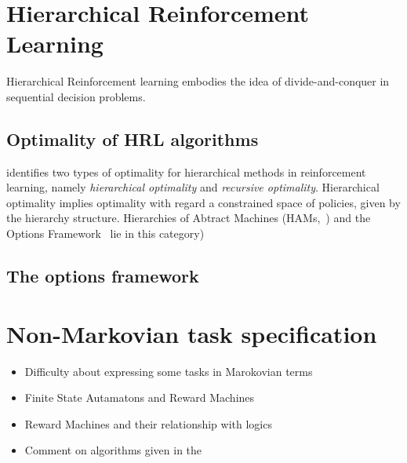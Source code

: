 \section{Hierarchical Reinforcement Learning}
Hierarchical Reinforcement learning embodies the idea of divide-and-conquer in sequential decision problems. 
\subsection{Optimality of HRL algorithms}
\cite{Dietterich2000} identifies two types of optimality for hierarchical methods in reinforcement learning, namely \textit{hierarchical optimality} and \textit{recursive optimality}. Hierarchical optimality implies optimality with regard a constrained space of policies, given by the hierarchy structure. Hierarchies of Abtract Machines (HAMs,~\cite{Parr1997}) and the Options Framework~\citep{Sutton1999} lie in this category) 
\subsection{The options framework}
\label{section:options}

\section{Non-Markovian task specification}
\label{section:non_markovian}
 {\color{blue}
 
 \begin{itemize}
 \item Difficulty about expressing some tasks in Marokovian terms 
 \item Finite State Autamatons and Reward Machines 
 \item Reward Machines and their relationship with logics
 \item Comment on algorithms given in the 
  
\end{itemize}
 
 }



